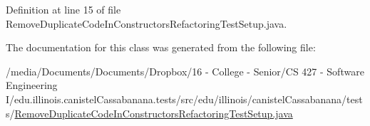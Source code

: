 Definition at line 15 of file RemoveDuplicateCodeInConstructorsRefactoringTestSetup.java.



The documentation for this class was generated from the following file:\begin{DoxyCompactItemize}
\item 
/media/Documents/Documents/Dropbox/16 -\/ College -\/ Senior/CS 427 -\/ Software Engineering I/edu.illinois.canistelCassabanana.tests/src/edu/illinois/canistelCassabanana/tests/\hyperlink{RemoveDuplicateCodeInConstructorsRefactoringTestSetup_8java}{RemoveDuplicateCodeInConstructorsRefactoringTestSetup.java}\end{DoxyCompactItemize}
